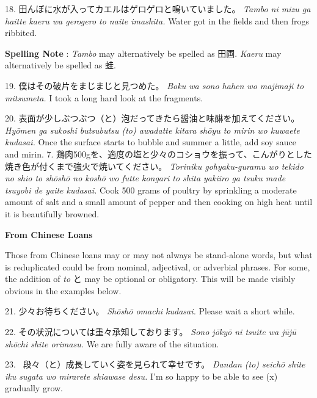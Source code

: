 \par{18. 田んぼに水が入ってカエルはゲロゲロと鳴いていました。 \hfill\break
 \emph{Tambo ni mizu ga haitte kaeru wa gerogero to naite imashita. }\hfill\break
Water got in the fields and then frogs ribbited. }

\par{\textbf{Spelling Note }: \emph{Tambo }may alternatively be spelled as 田圃. \emph{Kaeru }may alternatively be spelled as 蛙. }

\par{19. 僕はその破片をまじまじと見つめた。 \hfill\break
 \emph{Boku wa sono hahen wo majimaji to mitsumeta. \hfill\break
 }I took a long hard look at the fragments. }

\par{20. 表面が少しぶつぶつ（と）泡だってきたら醤油と味醂を加えてください。 \hfill\break
 \emph{Hyōmen ga sukoshi butsubutsu (to) awadatte kitara shōyu to mirin wo kuwaete kudasai. }\hfill\break
Once the surface starts to bubble and summer a little, add soy sauce and mirin. 7. 鶏肉500gを、適度の塩と少々のコショウを振って、こんがりとした焼き色が付くまで強火で焼いてください。 \hfill\break
 \emph{Toriniku gohyaku-guramu wo tekido no shio to shōshō no koshō wo futte kongari to shita yaki\textquotesingle iro ga tsuku made tsuyobi de yaite kudasai. }\hfill\break
Cook 500 grams of poultry by sprinkling a moderate amount of salt and a small amount of pepper and then cooking on high heat until it is beautifully browned. }

\begin{center}
\textbf{From Chinese Loans }
\end{center}

\par{ Those from Chinese loans may or may not always be stand-alone words, but what is reduplicated could be from nominal, adjectival, or adverbial phrases. For some, the addition of \emph{to }と may be optional or obligatory. This will be made visibly obvious in the examples below. }

\par{21. 少々お待ちください。 \hfill\break
 \emph{Shōshō omachi kudasai. }\hfill\break
Please wait a short while. }

\par{22. その状況については重々承知しております。 \hfill\break
 \emph{Sono jōkyō ni tsuite wa jūjū shōchi shite orimasu. \hfill\break
 }We are fully aware of the situation. }

\par{23.  段々（と）成長していく姿を見られて幸せです。 \hfill\break
 \emph{Dandan (to) seichō shite iku sugata wo mirarete shiawase desu. }\hfill\break
I'm so happy to be able to see (x) gradually grow. }

